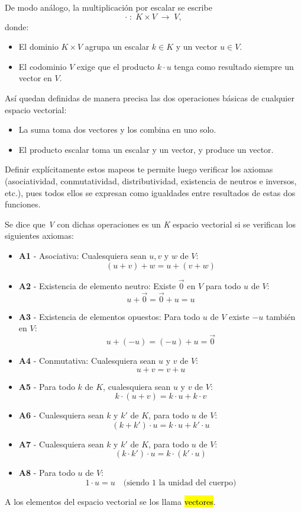 De modo análogo, la multiplicación por escalar se escribe
\[
  \cdot\;:\;K\times V\;\longrightarrow\;V,
\]
donde:
\begin{itemize}
  \item El dominio \(K\times V\) agrupa un escalar \(k\in K\) y un vector \(u\in V\).
  \item El codominio \(V\) exige que el producto \(k\cdot u\) tenga como resultado siempre un vector en \(V\).
\end{itemize}
Así quedan definidas de manera precisa las dos operaciones básicas de cualquier espacio vectorial:
\begin{itemize}
  \item La suma toma dos vectores y los combina en uno solo.
  \item El producto escalar toma un escalar y un vector, y produce un vector.
\end{itemize}

Definir explícitamente estos mapeos te permite luego verificar los axiomas (asociatividad, conmutatividad, distributividad, existencia de neutros e inversos, etc.), pues todos ellos se expresan como igualdades entre resultados de estas dos funciones.

Se dice que \textit{V} con dichas operaciones es un \textit{K} espacio vectorial si se verifican los siguientes axiomas:
\begin{itemize}
  \item \textbf{A1} - Asociativa: Cualesquiera sean \(u,v\) y \(w\) de \(V\): \[
    (u+v)+w = u + (v+w)
  \]
  \item \textbf{A2} - Existencia de elemento neutro: Existe \(\vec{0}\) en \(V\) para todo \(u\) de \(V\):\[
    u+\vec{0}=\vec{0}+u = u
  \]
  \item \textbf{A3} - Existencia de elementos opuestos: Para todo \(u\) de \(V\) existe \(-u\) también en \(V\):\[
    u + (-u) = (-u) + u = \vec{0}
  \]
  \item \textbf{A4} - Conmutativa: Cualesquiera sean \(u\) y \(v\) de \(V\): \[
    u + v = v + u
  \]
  \item \textbf{A5} - Para todo \(k\) de \(K\), cualesquiera sean \(u\) y \(v\) de \(V\): \[
    k\cdot (u+v)=k\cdot u+k\cdot v
  \]
  \item \textbf{A6} - Cualesquiera sean \(k\) y \(k'\) de \(K\), para todo \(u\) de \(V\):\[
    (k + k')\cdot u = k \cdot u + k' \cdot u
  \]
  \item \textbf{A7} - Cualesquiera sean \(k\) y \(k'\) de \(K\), para todo \(u\) de \(V\):\[
    (k\cdot k')\cdot u = k \cdot (k' \cdot u)
  \]
  \item \textbf{A8} - Para todo \(u\) de \(V\): \[
    1 \cdot u = u \quad \text{(siendo 1 la unidad del cuerpo)}
  \]
\end{itemize}
A los elementos del espacio vectorial se los llama \hl{vectores}.

